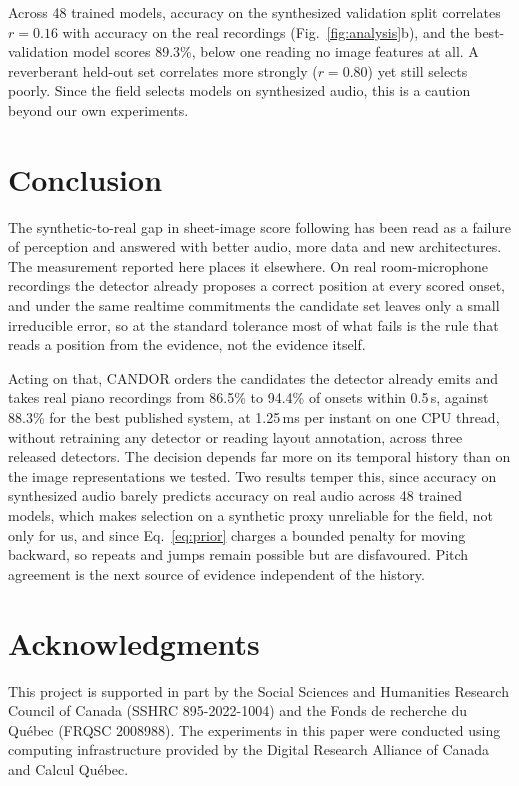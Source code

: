 \documentclass{article}
\newcommand{\sys}{CANDOR}
\begin{document}
Across 48 trained models, accuracy on the synthesized validation split
correlates $r=0.16$ with accuracy on the real recordings
(Fig.~\ref{fig:analysis}b), and the best-validation model scores 89.3\%, below
one reading no image features at all. A reverberant held-out set correlates
more strongly ($r=0.80$) yet still selects poorly. Since the field selects
models on synthesized audio, this is a caution beyond our own experiments.

\section{Conclusion}
\label{sec:conclusion}

The synthetic-to-real gap in sheet-image score following has been read as a
failure of perception and answered with better audio, more data and new
architectures. The measurement reported here places it elsewhere. On real
room-microphone recordings the detector already proposes a correct position at
every scored onset, and under the same realtime commitments the candidate
set leaves only a small irreducible error, so at the standard tolerance most of
what fails is the rule that reads a position from the evidence, not the
evidence itself.

Acting on that, \sys{} orders the candidates the detector already emits and
takes real piano recordings from 86.5\% to 94.4\% of onsets within 0.5\,s,
against 88.3\% for the best published system, at 1.25\,ms per instant on one
CPU thread, without retraining any detector or reading layout annotation,
across three released detectors. The decision depends far more on its temporal
history than on the image representations we tested. Two results temper this,
since accuracy on synthesized audio barely predicts accuracy on real audio
across 48 trained models, which makes selection on a synthetic proxy unreliable
for the field, not only for us, and since Eq.~\ref{eq:prior} charges a bounded
penalty for moving backward, so repeats and jumps remain possible but are
disfavoured. Pitch agreement is the next source of evidence independent of the
history.

\newpage

\section{Acknowledgments}
\label{sec:ack}
This project is supported in part by the Social Sciences and Humanities
Research Council of Canada (SSHRC 895-2022-1004) and the Fonds de recherche du
Qu\'ebec (FRQSC 2008988). The experiments in this paper were conducted using
computing infrastructure provided by the Digital Research Alliance of Canada
and Calcul Qu\'ebec.

{\footnotesize

}
\end{document}
